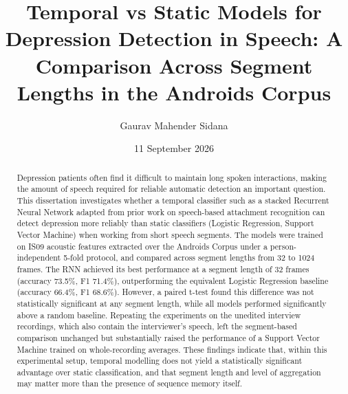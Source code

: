 \documentclass{mproj}
\begin{document}
\title{Temporal vs Static Models for Depression Detection in Speech: A Comparison Across Segment Lengths in the Androids Corpus}
\author{Gaurav Mahender Sidana}
\date{11 September 2026}
\maketitle

\begin{abstract}
Depression patients often find it difficult to maintain long spoken interactions, making the amount of speech required for reliable automatic detection an important question. This dissertation investigates whether a temporal classifier such as a stacked Recurrent Neural Network adapted from prior work on speech-based attachment recognition can detect depression more reliably than static classifiers (Logistic Regression, Support Vector Machine) when working from short speech segments. The models were trained on IS09 acoustic features extracted over the Androids Corpus under a person-independent 5-fold protocol, and compared across segment lengths from 32 to 1024 frames. The RNN achieved its best performance at a segment length of 32 frames (accuracy 73.5\%, F1 71.4\%), outperforming the equivalent Logistic Regression baseline (accuracy 66.4\%, F1 68.6\%). However, a paired t-test found this difference was not statistically significant at any segment length, while all models performed significantly above a random baseline. Repeating the experiments on the unedited interview recordings, which also contain the interviewer's speech, left the segment-based comparison unchanged but substantially raised the performance of a Support Vector Machine trained on whole-recording averages. These findings indicate that, within this experimental setup, temporal modelling does not yield a statistically significant advantage over static classification, and that segment length and level of aggregation may matter more than the presence of sequence memory itself.
\end{abstract}

\educationalconsent

\end{document}
